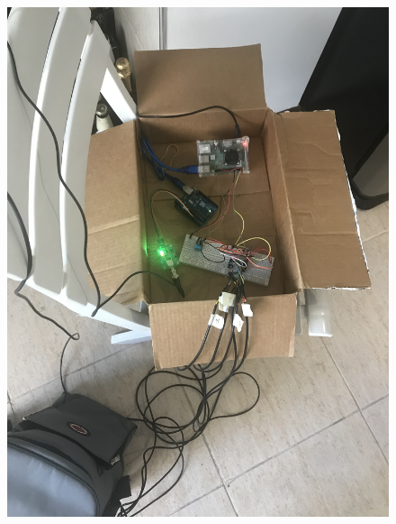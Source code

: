     \begin{figure}
        \centering
        \includegraphics[scale=0.1]{Anexo/FotosExperimentos/P7.jpg}
        \label{fig:MontajeSist}
    \end{figure}
    
